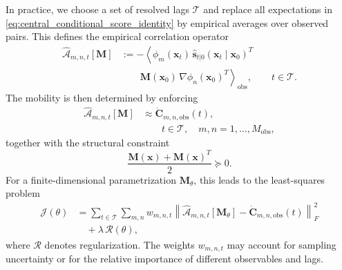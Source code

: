 \documentclass[11pt,twoside,fleqn]{article}
\begin{document}
In practice, we choose a set of resolved lags $\mathcal{T}$ and replace all expectations in \eqref{eq:central_conditional_score_identity} by empirical averages over observed pairs. This defines the empirical correlation operator
\begin{equation}
\begin{aligned}
    \widehat{\mathcal{A}}_{m,n,t}[\bm{M}]
    &:=
    -
    \left\langle
        \phi_m(\bm{x}_t)\,
        \widehat{\bm{s}}_{t|0}(\bm{x}_t\mid \bm{x}_0)^T
    \right. \\
    &\qquad\left.
        \bm{M}(\bm{x}_0)\,
        \nabla\phi_n(\bm{x}_0)^T
    \right\rangle_{\mathrm{obs}},
    \qquad
    t\in\mathcal{T}.
\end{aligned}
    \label{eq:empirical_mobility_operator}
\end{equation}
The mobility is then determined by enforcing
\begin{equation}
\begin{aligned}
    \widehat{\mathcal{A}}_{m,n,t}[\bm{M}]
    &\approx
    \dot{\bm{C}}_{m,n,\mathrm{obs}}(t),
    \\
    &\qquad
    t\in\mathcal{T},
    \quad
    m,n=1,\dots,M_{\mathrm{obs}},
\end{aligned}
    \label{eq:mobility_correlation_constraint}
\end{equation}
together with the structural constraint
\begin{equation}
    \frac{\bm{M}(\bm{x})+\bm{M}(\bm{x})^T}{2}\succeq 0 .
    \label{eq:mobility_positive_constraint}
\end{equation}
For a finite-dimensional parametrization $\bm{M}_\theta$, this leads to the least-squares problem
\begin{equation}
\begin{aligned}
    \mathcal{J}(\theta)
    &=
    \sum_{t\in\mathcal{T}}
    \sum_{m,n}
    w_{m,n,t}
    \left\|
        \widehat{\mathcal{A}}_{m,n,t}[\bm{M}_\theta]
        -
        \dot{\bm{C}}_{m,n,\mathrm{obs}}(t)
    \right\|_F^2
    \\
    &\quad+
    \lambda\,\mathcal{R}(\theta),
\end{aligned}
    \label{eq:mobility_objective_general}
\end{equation}
where $\mathcal{R}$ denotes regularization. The weights $w_{m,n,t}$ may account for sampling uncertainty or for the relative importance of different observables and lags.
\end{document}

